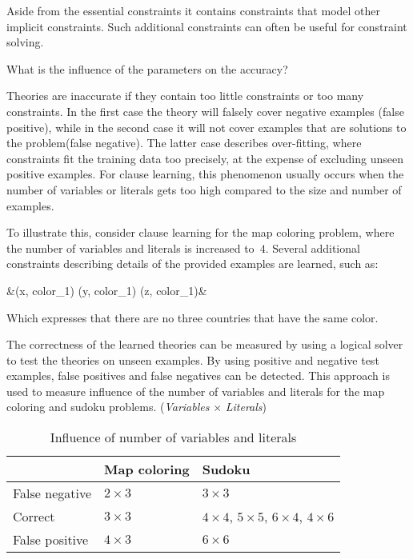 Aside from the essential constraints it contains constraints that model other implicit constraints.
Such additional constraints can often be useful for constraint solving.

\begin{question}
	What is the influence of the parameters on the accuracy?
	\label{q:cd_acc_influence}
\end{question}

\begin{observation}
	Theories are inaccurate if they contain too little constraints or too many constraints.
	In the first case the theory will falsely cover negative examples (false positive), while in the second case it will not cover examples that are solutions to the problem(false negative).
	The latter case describes over-fitting, where constraints fit the training data too precisely, at the expense of excluding unseen positive examples.
	For clause learning, this phenomenon usually occurs when the number of variables or literals gets too high compared to the size and number of examples.

	To illustrate this, consider clause learning for the map coloring problem, where the number of variables and literals is increased to~$4$.
	Several additional constraints describing details of the provided examples are learned, such as: 
	\begin{shiftedflalign*}
		 &\leftarrow {}(x, color_1) \land {}(y, color_1)  \land {}(z, color_1)&
	\end{shiftedflalign*}
 	Which expresses that there are no three countries that have the same color.
\end{observation}

\begin{experiment}
	\label{exp:cd_acc_influence_par}
	The correctness of the learned theories can be measured by using a logical solver to test the theories on unseen examples.
	By using positive and negative test examples, false positives and false negatives can be detected.
	This approach is used to measure influence of the number of variables and literals for the map coloring and sudoku problems.
	(\emph{Variables} $\times$ \emph{Literals})

	\begin{table}[!htp]
		\begin{tabularx}{\textwidth}{l|ll}
			 & \textbf{Map coloring}		& \textbf{Sudoku} \\
			\toprule
			False negative 	& $2 \times 3$				& $3 \times 3$ \\
			Correct 		& $3 \times 3$				& $4 \times 4$, $5 \times 5$, $6 \times 4$, $4 \times 6$ \\
			False positive 	& $4 \times 3$				& $6 \times 6$	\\
		\end{tabularx}
		\caption{Influence of number of variables and literals}
		\label{tbl:cd_acc_influence}
	\end{table}

\end{experiment}

